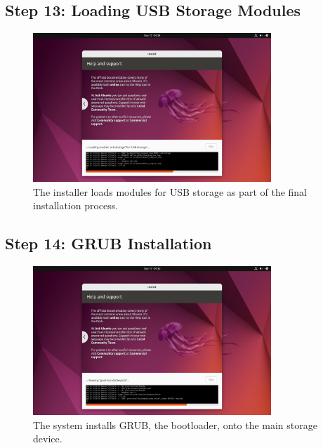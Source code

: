 \documentclass{article}
\begin{document}
\subsection{Step 13: Loading USB Storage Modules}
\begin{figure}[H]
    \centering
    \includegraphics[width=0.8\textwidth]{2024-09-17_04-35-01.png}
    \caption{The installer loads modules for USB storage as part of the final installation process.}
\end{figure}

\subsection{Step 14: GRUB Installation}
\begin{figure}[H]
    \centering
    \includegraphics[width=0.8\textwidth]{2024-09-17_04-36-26.png}
    \caption{The system installs GRUB, the bootloader, onto the main storage device.}
\end{figure}
\end{document}
